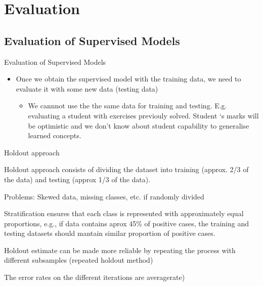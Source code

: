 \documentclass{beamer}
\begin{document}
\section{Evaluation}


\subsection{Evaluation of Supervised Models}

\begin{frame}{Evaluation of Supervised Models}



\begin{itemize}
 \item Once we obtain the supervised model with the training data, we need to evaluate it with some new data (testing data)
 
 \begin{itemize}
  \item We cannnot use the the same data for training and testing. E.g. evaluating a student with exercises previouly solved. Student ‘s marks will be optimistic and we don’t know about student capability to generalise learned concepts.
 \end{itemize}

\end{itemize}


\end{frame}


\begin{frame}{Holdout approach}


\alert{Holdout approach} consists of dividing the dataset into training (approx. 2/3 of the data) and testing (approx 1/3 of the data).

Problems: Skewed data, missing classes, etc. if randomly divided

\alert{Stratification} ensures that each class is represented with approximately equal proportions, e.g., if data contains aprox 45\% of positive cases, the training and testing datasets should mantain similar proportion of positive cases. 

Holdout estimate can be made more reliable by repeating the process with different subsamples (\alert{repeated holdout method})

The error rates on the different iterations are averagerate)
\end{frame}
\end{document}
